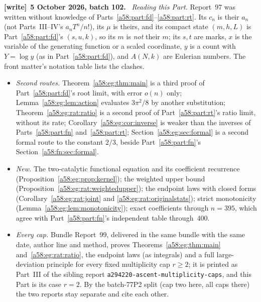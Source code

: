 \documentclass[11pt,letterpaper]{article}
\newcommand{\file}[1]{\nolinkurl{#1}}
\theoremstyle{remark}
\newenvironment{writenote}[1][]{\par\smallskip\begingroup\small
 \noindent\textbf{[write]}\if\relax\detokenize{#1}\relax\else~\textbf{#1.}\fi\ }%
 {\par\endgroup\smallskip}
\begin{document}
\begin{writenote}[5 October 2026, batch 102]
\emph{Reading this Part.} Report~97 was written without knowledge of Parts~\ref{a58:part:fd}--\ref{a58:part:rt}. Its $c_n$ is their $a_n$ (not Parts~III--IV's $a_nT^n/n!$), its $\mu$ is theirs, and its compact state $(m,h,L)$ is Part~\ref{a58:part:fd}'s $(s,u,k)$, so its $m$ is \emph{not} their $m$; its $s,t$ are marks, $x$ is the variable of the generating function or a scaled coordinate, $y$ is a count with $Y=\log y$ (as in Part~\ref{a58:part:fd}), and $A(N,k)$ are Eulerian numbers. The front matter's notation table lists the clashes.
\begin{itemize}
\item \emph{Second routes.} Theorem~\ref{a58:eg:thm:main} is a third proof of Part~\ref{a58:part:fd}'s root limit, with error $o(n)$ only; Lemma~\ref{a58:eg:lem:action} evaluates $3\pi^2/8$ by another substitution; Theorem~\ref{a58:eg:rat:ratio} is a second proof of Part~\ref{a58:part:rt}'s ratio limit, without its rate; Corollary~\ref{a58:eg:cor:inverse} is weaker than the inverses of Parts~\ref{a58:part:fn} and~\ref{a58:part:rt}; Section~\ref{a58:eg:sec:formal} is a second formal route to the constant $2/3$, beside Part~\ref{a58:part:fn}'s Section~\ref{a58:fn:sec:formal}.
\item \emph{New.} The two-catalytic functional equation and its coefficient recurrence (Proposition~\ref{a58:eg:prop:kernel}); the weighted upper bound (Proposition~\ref{a58:eg:rat:weightedupper}); the endpoint laws with closed forms (Corollary~\ref{a58:eg:rat:joint} and \eqref{a58:eg:rat:originalstats}); strict monotonicity (Lemma~\ref{a58:eg:lem:monotonicity}); exact coefficients through $n=395$, which agree with Part~\ref{a58:part:fn}'s independent table through~$400$.
\item \emph{Every cap.} Bundle Report~99, delivered in the same bundle with the same date, author line and method, proves Theorems~\ref{a58:eg:thm:main} and~\ref{a58:eg:rat:ratio}, the endpoint laws (as integrals) and a full large-deviation principle for every fixed multiplicity cap $r\ge2$; it is printed as Part~III of the sibling report \file{a294220-ascent-multiplicity-caps}, and this Part is its case $r=2$. By the batch-77P2 split (cap two here, all caps there) the two reports stay separate and cite each other.
\end{itemize}
\end{writenote}
\end{document}
